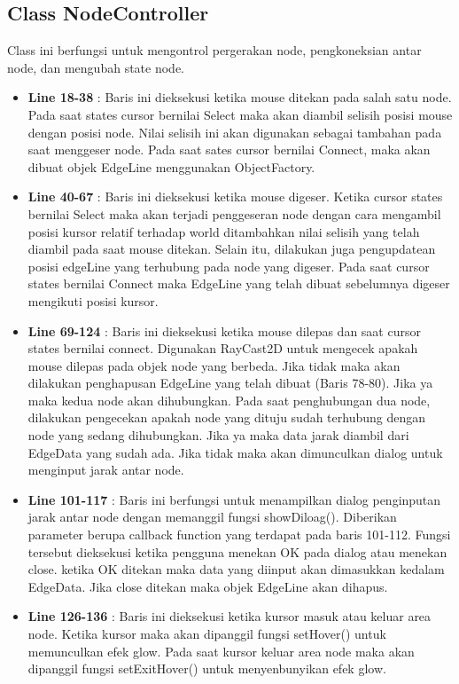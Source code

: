 \documentclass[12pt,a4paper,oneside]{article}
\begin{document}
\subsection{Class NodeController}
Class ini berfungsi untuk mengontrol pergerakan node, pengkoneksian antar node, dan mengubah state node.
\begin{itemize}
	\item \textbf{Line 18-38} : Baris ini dieksekusi ketika mouse ditekan pada salah satu node. Pada saat states cursor bernilai Select maka akan diambil selisih posisi mouse dengan posisi node. Nilai selisih ini akan digunakan sebagai tambahan pada saat menggeser node. Pada saat sates cursor bernilai Connect, maka akan dibuat objek EdgeLine menggunakan ObjectFactory.
	\item \textbf{Line 40-67} : Baris ini dieksekusi ketika mouse digeser. Ketika cursor states bernilai Select maka akan terjadi penggeseran node dengan cara mengambil posisi kursor relatif terhadap world ditambahkan nilai selisih yang telah diambil pada saat mouse ditekan. Selain itu, dilakukan juga pengupdatean posisi edgeLine yang terhubung pada node yang digeser. Pada saat cursor states bernilai Connect maka EdgeLine yang telah dibuat sebelumnya digeser mengikuti posisi kursor.
	\item \textbf{Line 69-124} : Baris ini dieksekusi ketika mouse dilepas dan saat cursor states bernilai connect. Digunakan RayCast2D untuk mengecek apakah mouse dilepas pada objek node yang berbeda. Jika tidak maka akan dilakukan penghapusan EdgeLine yang telah dibuat (Baris 78-80). Jika ya maka kedua node akan dihubungkan. Pada saat penghubungan dua node, dilakukan pengecekan apakah node yang dituju sudah terhubung dengan node yang sedang dihubungkan. Jika ya maka data jarak diambil dari EdgeData yang sudah ada. Jika tidak maka akan dimunculkan dialog untuk menginput jarak antar node.
	\item \textbf{Line 101-117} : Baris ini berfungsi untuk menampilkan dialog penginputan jarak antar node dengan memanggil fungsi showDiloag(). Diberikan parameter berupa callback function yang terdapat pada baris 101-112. Fungsi tersebut dieksekusi ketika pengguna menekan OK pada dialog atau menekan close. ketika OK ditekan maka data yang diinput akan dimasukkan kedalam EdgeData. Jika close ditekan maka objek EdgeLine akan dihapus. 
	\item \textbf{Line 126-136} : Baris ini dieksekusi ketika kursor masuk atau keluar area node. Ketika kursor maka akan dipanggil fungsi setHover() untuk memunculkan efek glow. Pada saat kursor keluar area node maka akan dipanggil fungsi setExitHover() untuk menyenbunyikan efek glow.
\end{itemize}
\end{document}

